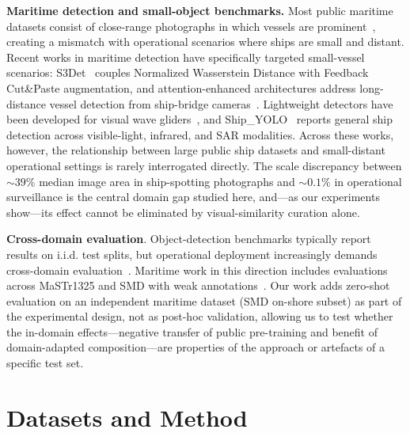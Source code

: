 \documentclass[10pt,conference]{IEEEtran}
\begin{document}
\textbf{Maritime detection and small-object benchmarks.} Most public maritime datasets consist of close-range photographs in which vessels are prominent~\cite{shao2018seaships,teixeira2025inatechships}, creating a mismatch with operational scenarios where ships are small and distant. Recent works in maritime detection have specifically targeted small-vessel scenarios: S3Det~\cite{li2024s3det} couples Normalized Wasserstein Distance with Feedback Cut\&Paste augmentation, and attention-enhanced architectures address long-distance vessel detection from ship-bridge cameras~\cite{zhang2025longdistance}. Lightweight detectors have been developed for visual wave gliders~\cite{ding2025waveglider}, and Ship\_YOLO~\cite{li2025shipyolo} reports general ship detection across visible-light, infrared, and SAR modalities.
 Across these works, however, the relationship between large public ship datasets and small-distant operational settings is rarely interrogated directly. The scale discrepancy between $\sim 39\%$ median image area in ship-spotting photographs and $\sim 0.1\%$ in operational surveillance is the central domain gap studied here, and—as our experiments show—its effect cannot be eliminated by visual-similarity curation alone.

 \textbf{Cross-domain evaluation}. Object-detection benchmarks typically report results on i.i.d. test splits, but operational deployment increasingly demands cross-domain evaluation~\cite{oza2023uda}. Maritime work in this direction includes evaluations across MaSTr1325 and SMD with weak annotations~\cite{bovcon2022slr}. Our work adds zero-shot evaluation on an independent maritime dataset (SMD on-shore subset) as part of the experimental design, not as post-hoc validation, allowing us to test whether the in-domain effects—negative transfer of public pre-training and benefit of domain-adapted composition—are properties of the approach or artefacts of a specific test set.

\section{Datasets and Method}
\end{document}
